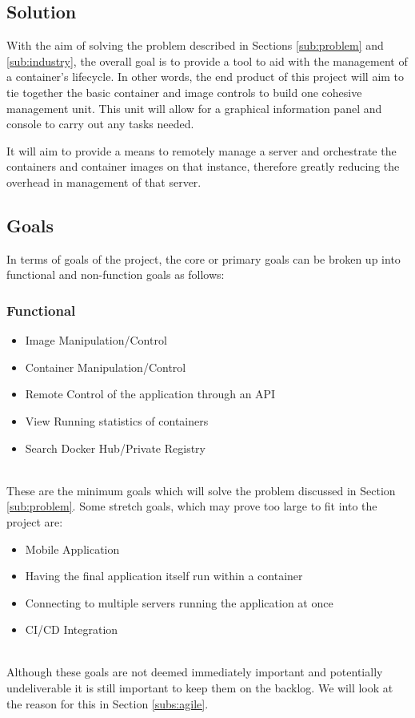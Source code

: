 \documentclass{article}
\begin{document}
\subsection{Solution}
With the aim of solving the problem described in Sections \ref{sub:problem} and \ref{sub:industry}, the overall goal is to provide a tool to aid with the management of a container's lifecycle. In other words, the end product of this project will aim to tie together the basic container and image controls to build one cohesive management unit. This unit will allow for a graphical information panel and console to carry out any tasks needed.

It will aim to provide a means to remotely manage a server and orchestrate the containers and container images on that instance, therefore greatly reducing the overhead in management of that server.

\subsection{Goals}
In terms of goals of the project, the core or primary goals can be broken up into functional and non-function goals as follows:

\subsubsection{Functional}

\begin{itemize}
  \item Image Manipulation/Control
  \item Container Manipulation/Control
  \item Remote Control of the application through an API
  \item View Running statistics of containers
  \item Search Docker Hub/Private Registry 
\end{itemize}
\mbox{}\\
These are the minimum goals which will solve the problem discussed in Section \ref{sub:problem}. Some stretch goals, which may prove too large to fit into the project are:
\mbox{}\\
\begin{itemize}
  \item Mobile Application
  \item Having the final application itself run within a container
  \item Connecting to multiple servers running the application at once
  \item CI/CD Integration
\end{itemize}
\mbox{}\\
Although these goals are not deemed immediately important and potentially undeliverable it is still important to keep them on the backlog. We will look at the reason for this in Section \ref{subs:agile}.
\end{document}
